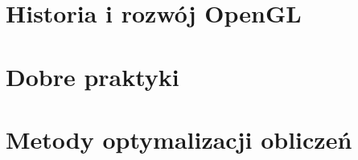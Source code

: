 \documentclass[12pt]{article}
\begin{document}
\baselineskip





\section{Historia i rozwój OpenGL}




\section{Dobre praktyki}


\section{Metody optymalizacji obliczeń}



\end{document}
